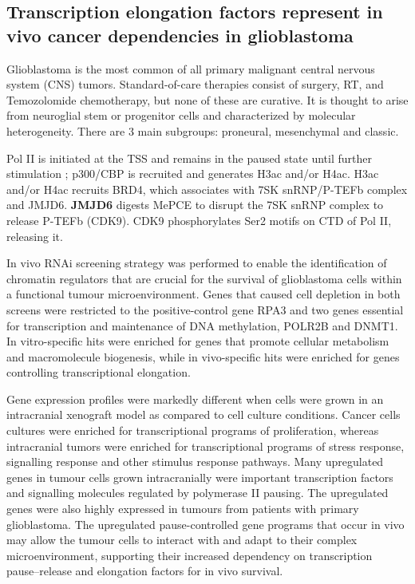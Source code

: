 \subsection{Transcription elongation factors represent in vivo cancer dependencies in glioblastoma}
Glioblastoma is the most common of all primary malignant central nervous system (CNS) tumors. Standard-of-care therapies consist of surgery, RT, and Temozolomide chemotherapy, but none of these are curative. It is thought to arise from neuroglial stem or progenitor cells and characterized by molecular heterogeneity. There are 3 main subgroups: proneural, mesenchymal and classic.

Pol II is initiated at the TSS and remains in the paused state until further stimulation ; p300/CBP is recruited and generates H3ac and/or H4ac. H3ac and/or H4ac recruits BRD4, which associates with 7SK snRNP/P-TEFb complex and JMJD6. \textbf{JMJD6} digests MePCE to disrupt the 7SK snRNP complex to release P-TEFb (CDK9). CDK9 phosphorylates Ser2 motifs on CTD of Pol II,  releasing it.

In vivo RNAi screening strategy was performed to enable the identification of chromatin regulators that are crucial for the survival of glioblastoma cells within a functional tumour microenvironment. Genes that caused cell depletion in both screens were restricted to the positive-control gene RPA3 and two genes essential for transcription and maintenance of DNA methylation, POLR2B and DNMT1. In vitro-specific hits were enriched for genes that promote cellular metabolism and macromolecule biogenesis, while in vivo-specific hits were enriched for genes controlling transcriptional elongation.

Gene expression profiles were markedly different when cells were grown in an intracranial xenograft model as compared to cell culture conditions. Cancer cells cultures were enriched for transcriptional programs of proliferation, whereas intracranial tumors were enriched for transcriptional programs of stress response, signalling response and other stimulus response pathways. Many upregulated genes in tumour cells grown intracranially were important transcription factors and signalling molecules regulated by polymerase II pausing. The upregulated genes were also highly expressed in tumours from patients with primary glioblastoma. The upregulated pause-controlled gene programs that occur in vivo may allow the tumour cells to interact with and adapt to their ­complex microenvironment, supporting their increased dependency on transcription pause–release and elongation factors for in vivo survival.

